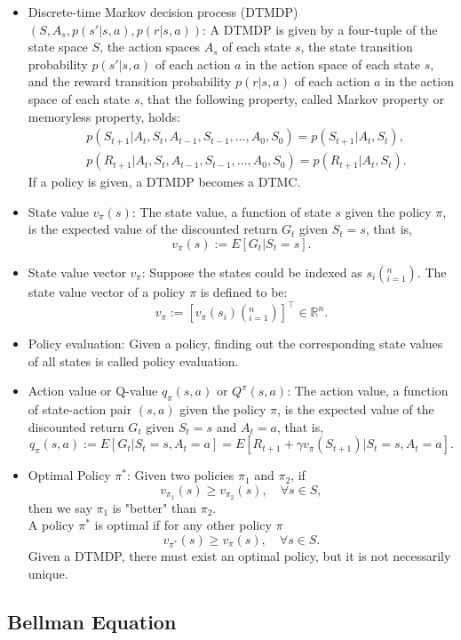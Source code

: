 \documentclass[a4paper,12pt]{report}
\begin{document}
\begin{itemize}
\item Discrete-time Markov decision process (DTMDP) $(S,A_s,p(s'|s,a),p(r|s,a))$: A DTMDP is given by a four-tuple of the state space $S$, the action spaces $A_s$ of each state $s$, the state transition probability $p(s'|s,a)$ of each action $a$ in the action space of each state $s$, and the reward transition probability $p(r|s,a)$ of each action $a$ in the action space of each state $s$, that the following property, called Markov property or memoryless property, holds:
\[\begin{aligned}
& p(S_{t+1}|A_t,S_t,A_{t-1},S_{t-1},\ldots,A_0,S_0)=p(S_{t+1}|A_t,S_t),\\
& p(R_{t+1}|A_t,S_t,A_{t-1},S_{t-1},\ldots,A_0,S_0)=p(R_{t+1}|A_t,S_t).
\end{aligned}\]
If a policy is given, a DTMDP becomes a DTMC.
\item State value $v_{\pi}(s)$: The state value, a function of state $s$ given the policy $\pi$, is the expected value of the discounted return $G_t$ given $S_t=s$, that is,
\[v_{\pi}(s):= E[G_t|S_t=s].\]
\item State value vector $v_{\pi}$: Suppose the states could be indexed as $s_i\left(_{i=1}^n\right)$. The state value vector of a policy $\pi$ is defined to be:
\[v_{\pi}:=[v_{\pi}(s_i)\left(_{i=1}^n\right)]^{\top}\in\mathbb{R}^n.\]
\item Policy evaluation: Given a policy, finding out the corresponding state values of all states is called policy evaluation.
\item Action value or Q-value $q_{\pi}(s,a)$ or $Q^{\pi}(s,a)$: The action value, a function of state-action pair $(s,a)$ given the policy $\pi$, is the expected value of the discounted return $G_t$ given $S_t=s$ and $A_t=a$, that is,
\[q_{\pi}(s,a):= E[G_t|S_t=s,A_t=a]= E[R_{t+1}+\gamma v_{\pi}(S_{t+1})|S_t=s,A_t=a].\]
\item Optimal Policy $\pi^*$: Given two policies $\pi_1$ and $\pi_2$, if
\[v_{\pi_1}(s)\geq v_{\pi_2}(s),\quad\forall s\in S,\]
then we say $\pi_1$ is "better" than $\pi_2$.\\
A policy $\pi^*$ is optimal if for any other policy $\pi$
\[v_{\pi^*}(s)\geq v_{\pi}(s),\quad\forall s\in S.\]
Given a DTMDP, there must exist an optimal policy, but it is not necessarily unique.
\end{itemize}
\subsection{Bellman Equation}
\end{document}

